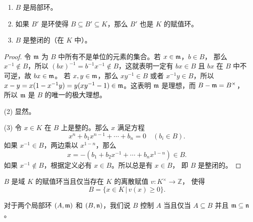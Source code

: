 \begin{proposition}
  \mbox{}
  \begin{enumerate}
    \item $B$ 是局部环。
    \item 如果 $B'$ 是环使得 $B\subseteq B'\subseteq K$，那么 $B'$ 也是 $K$ 的赋值环。
    \item $B$ 是整闭的（在 $K$ 中）。
  \end{enumerate}
\end{proposition}
\begin{proof}
  令 $\mathfrak{m}$ 为 $B$ 中所有不是单位的元素的集合。若 $x\in\mathfrak{m}$，$b\in B$，
  那么 $x^{-1}\notin B$，所以 $(bx)^{-1}=b^{-1}x^{-1}\notin B$，这就表明一定有
  $bx\in B$ 且 $bx$ 在 $B$ 中不可逆，故 $bx\in\mathfrak{m}$。
  若 $x,y\in\mathfrak{m}$，那么 $xy^{-1}\in B$ 或者 $x^{-1}y\in B$，所以
  $x-y=x(1-x^{-1}y)=y(xy^{-1}-1)\in \mathfrak{m}$。这表明 $\mathfrak{m}$ 是理想，而
  $B-\mathfrak{m}=B^\times$，所以 $\mathfrak{m}$ 是 $B$ 的唯一的极大理想。

  (2) 显然。

  (3) 令 $x\in K$ 在 $B$ 上是整的。那么 $x$ 满足方程
  \[
    x^n+b_1x^{n-1}+\cdots+b_n=0\quad (b_i\in B).  
  \]
  如果 $x^{-1}\in B$，两边乘以 $x^{1-n}$，那么
  \[
    x=-(b_1+b_2x^{-1}+\cdots+b_nx^{1-n}) \in B. 
  \]
  如果 $x^{-1}\notin B$，根据定义必有 $x\in B$。所以总是有 $x\in B$，
  即 $B$ 是整闭的。
\end{proof}

\begin{proposition}
  $B$ 是域 $K$ 的赋值环当且仅当存在 $K$ 的离散赋值 $v:K^\times\to \mathbb{Z}$，
  使得
  \[
    B=\{x\in K\,|\, v(x)\geq 0\}  .
  \]
\end{proposition}

对于两个局部环 $(A,\mathfrak{m})$ 和 $(B,\mathfrak{n})$，我们说 $B$ 控制 $A$ 当且仅当
$A\subseteq B$ 并且 $\mathfrak{m}\subseteq\mathfrak{n}$。

